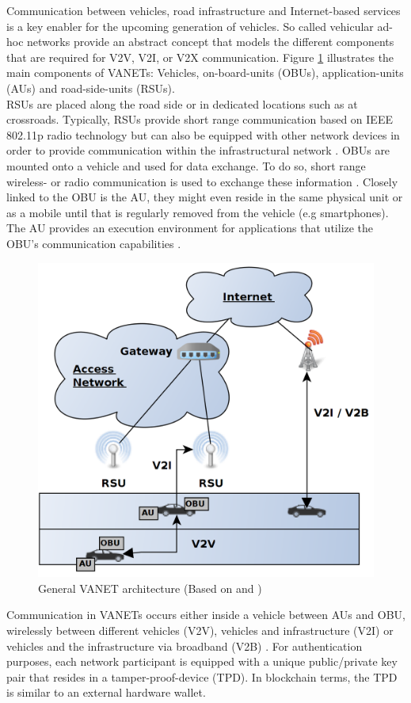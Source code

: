 \documentclass{llncs}
\begin{document}
{			Communication between vehicles, road infrastructure and Internet-based services is a key enabler for the upcoming generation of vehicles. So called vehicular ad-hoc networks provide an abstract concept that models the different components that are required for V2V, V2I, or V2X communication. Figure \ref{fig:vanets} illustrates the main components of VANETs: Vehicles, on-board-units (OBUs), application-units (AUs) and road-side-units (RSUs).\\
			RSUs are placed  along the road side or in dedicated locations such as at crossroads. Typically, RSUs provide short range communication based on IEEE 802.11p radio technology but can also be equipped with other network devices in order to provide communication within the infrastructural network \cite{al2014comprehensive}. OBUs are mounted onto a vehicle and used for data exchange. To do so, short range wireless- or radio communication is used to exchange these information \cite{baldessari2007car}. Closely linked to the OBU is the AU, they might even reside in the same physical unit or as a mobile until that is regularly removed from the vehicle (e.g smartphones). The AU provides an execution environment for applications that utilize the OBU's communication capabilities \cite{al2014comprehensive}\cite{baldessari2007car}.\\	
			\begin{figure}[ht]
				\centering
				\includegraphics[scale=0.2]{Figures/Vanets.png}
				\caption{General VANET architecture (Based on \protect\cite{baldessari2007car} and \cite{leiding2016self})}
				\label{fig:vanets}
			\end{figure}			
			Communication in VANETs occurs either inside a vehicle between AUs and OBU, wirelessly between different vehicles (V2V), vehicles and infrastructure (V2I) or vehicles and the infrastructure via broadband (V2B) \cite{faezipour2012progress}. For authentication purposes, each network participant is equipped with a unique public/private key pair that resides in a tamper-proof-device (TPD). In blockchain terms, the TPD is similar to an external hardware wallet.
			
}
\end{document}
